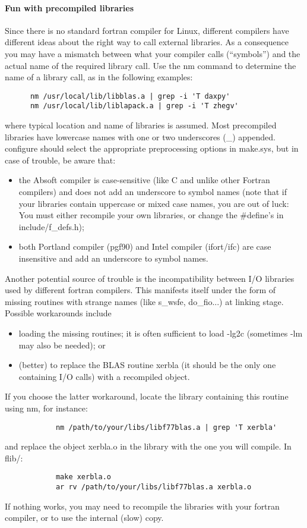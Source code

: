 \documentclass[12pt,a4paper]{article}
\begin{document}
\paragraph{Fun with precompiled libraries}
Since there is no standard fortran compiler for Linux, different
compilers have different ideas about the right way to call external
libraries. As a consequence you may have a mismatch between what your
compiler calls (“symbols”) and the actual name of the required 
library call. Use the nm command to determine the name of a library
call, as in the following examples:
\begin{verbatim}
      nm /usr/local/lib/libblas.a | grep -i 'T daxpy'
      nm /usr/local/lib/liblapack.a | grep -i 'T zhegv'
\end{verbatim}
where typical location and name of libraries is assumed. Most precompiled
libraries have lowercase names with one or two underscores (\_) appended.
configure should select the appropriate preprocessing options in make.sys,
but in case of trouble, be aware that:
\begin{itemize}
\item
the Absoft compiler is case-sensitive (like C and unlike other Fortran
compilers) and does not add an underscore to symbol names (note that
if your libraries contain uppercase or mixed case names, you are out
of luck: You must either recompile your own libraries, or change the
\#define's in include/f\_defs.h); 
\item 
both Portland compiler (pgf90) and Intel compiler (ifort/ifc)
are case insensitive and add an underscore to symbol names. 
\end{itemize}
Another potential source of trouble is the incompatibility between I/O
libraries used by different fortran compilers. This manifests itself
under the form of missing routines with strange names (like s\_wsfe, 
do\_fio...) at linking stage. Possible workarounds include
\begin{itemize}
\item
loading the missing routines; it is often suﬃcient to load -lg2c
(sometimes -lm may also be needed); or 
\item
 (better) to replace the BLAS routine xerbla (it should be the only
  one containing I/O calls) with a recompiled object.  
\end{itemize}
If you choose the latter workaround, locate the library containing
this routine using nm, for instance: 
\begin{verbatim}
            nm /path/to/your/libs/libf77blas.a | grep 'T xerbla'
\end{verbatim}
and replace the object xerbla.o in the library with the one you will
compile. In flib/: 
\begin{verbatim}
            make xerbla.o
            ar rv /path/to/your/libs/libf77blas.a xerbla.o
\end{verbatim}
If nothing works, you may need to recompile the libraries with your fortran
compiler, or to use the internal (slow) copy.
\end{document}
